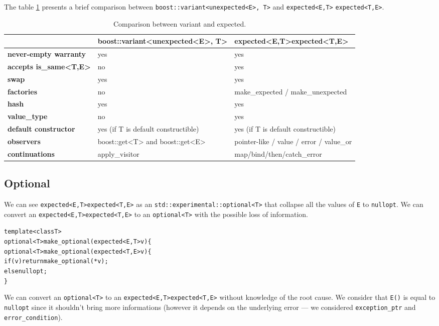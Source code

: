 \documentclass[a4paper,10pt]{article}
\newcommand{\cpp}[1]{\lstinline{#1}}
\newcommand{\suppress}[1]{\colorbox{suppress_color}{#1}}
\newcommand{\update}[1]{\colorbox{update_color}{#1}}
\begin{document}
The table \ref{comp-variant} presents a brief comparison between \cpp{boost::variant<unexpected<E>, T>} and \suppress{\cpp{expected<E,T>}} \update{\cpp{expected<T,E>}}.

\begin{table}[h!]
\bgroup
\def\arraystretch{1.5}
\begin{tabular}
{|l|>{\raggedright\arraybackslash}p{6cm}|>{\raggedright\arraybackslash}p{6cm}|}
\hline
                    & \textbf{boost::variant<unexpected<E>, T>} & \textbf{\suppress{expected<E,T>}\update{expected<T,E>}}  \\
\hline
\textbf{never-empty warranty} & yes & yes \\
\hline
\textbf{accepts is_same<T,E>} & no & yes \\
\hline
\textbf{swap} & yes & yes \\
\hline
\textbf{factories} & no & make\_expected / make\_unexpected  \\
\hline
\textbf{hash} & yes & yes  \\
\hline
\textbf{value_type} & no & yes  \\
\hline
\textbf{default constructor} & yes (if T is default constructible) & yes (if T is default constructible)  \\
\hline
\textbf{observers} & boost::get<T> and boost::get<E> & pointer-like / value / error / value_or \\
\hline
\textbf{continuations} & apply_visitor & map/bind/then/catch_error  \\
\hline
\end{tabular}
\egroup
\caption{Comparison between variant and expected.}
\label{comp-variant}
\end{table}


\subsection{Optional}

We can see \suppress{\cpp{expected<E,T>}}\update{\cpp{expected<T,E>}} as an \cpp{std::experimental::optional<T>} that collapse all the values of \cpp{E} to \cpp{nullopt}. We can convert an \suppress{\cpp{expected<E,T>}}\update{\cpp{expected<T,E>}} to an \cpp{optional<T>} with the possible loss of information.

\begin{alltt}
template <class T>
\suppress{optional<T> make_optional(expected<E,T> v) \{}
\update{optional<T> make_optional(expected<T,E> v) \{}
  if (v) return make_optional(*v);
  else nullopt;
\}
\end{alltt}
\noindent
We can convert an \cpp{optional<T>} to an \suppress{\cpp{expected<E,T>}}\update{\cpp{expected<T,E>}} without knowledge of the root cause. We consider that \cpp{E()} is equal to \cpp{nullopt} since it shouldn't bring more informations (however it depends on the underlying error --- we considered \cpp{exception_ptr} and \cpp{error_condition}).
\end{document}
